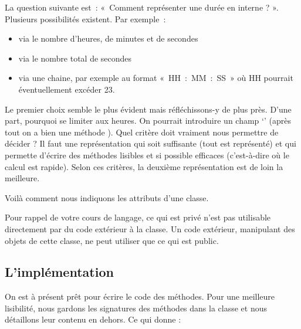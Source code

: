 		La question suivante est~: «~Comment représenter une durée en interne ?
		». Plusieurs possibilités existent. Par exemple~:	
		\begin{itemize}
			\item 
				via le nombre d’heures, de minutes et de secondes
			\item 
				via le nombre total de secondes
			\item 
				via une chaine, par exemple au format «~HH~:~MM~:~SS~» où HH pourrait
				éventuellement excéder 23.
		\end{itemize}
		
		Le premier choix semble le plus évident mais réfléchissons-y de plus
		près. D’une part, pourquoi se limiter aux heures. On pourrait
		introduire un champ ‘’ (après tout on a bien
		une méthode ). 		
		Quel critère doit vraiment nous permettre de décider ? Il faut une
		représentation qui soit suffisante (tout est représenté) et qui
		permette d’écrire des méthodes lisibles et si possible efficaces
		(c'est-à-dire où le calcul est rapide). Selon ces
		critères, la deuxième représentation est de loin la meilleure. 
		
		Voilà comment nous indiquons les attributs d'une classe.
		
		\begin{algo}
		\end{algo}
	
		Pour rappel de votre cours de langage,
		ce qui est privé n'est pas utilisable directement 
		par du code extérieur à la classe.
		Un code extérieur, manipulant des objets de cette classe,
		ne peut utiliser que ce qui est public.
		
	\subsection{L'implémentation}
	
		On est à présent prêt pour écrire le code des méthodes. 
		Pour une meilleure lisibilité,
		nous gardons les signatures des méthodes dans la classe
		et nous détaillons leur contenu en dehors.
		Ce qui donne :
		
